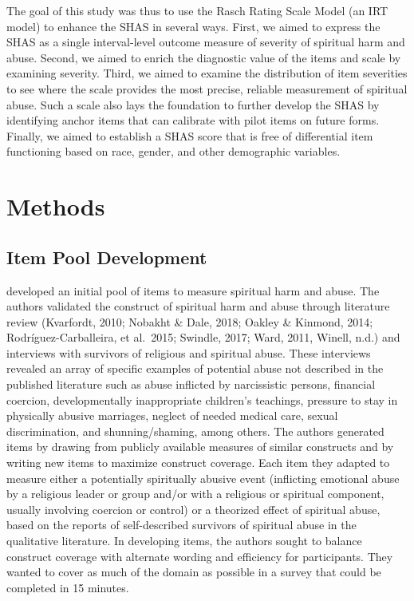 \documentclass[
]{article}
\begin{document}
The goal of this study was thus to use the Rasch Rating Scale Model (an IRT model) to enhance the SHAS in several ways. First, we aimed to express the SHAS as a single interval-level outcome measure of severity of spiritual harm and abuse. Second, we aimed to enrich the diagnostic value of the items and scale by examining severity. Third, we aimed to examine the distribution of item severities to see where the scale provides the most precise, reliable measurement of spiritual abuse. Such a scale also lays the foundation to further develop the SHAS by identifying anchor items that can calibrate with pilot items on future forms. Finally, we aimed to establish a SHAS score that is free of differential item functioning based on race, gender, and other demographic variables.

\hypertarget{methods}{%
\section{Methods}\label{methods}}

\hypertarget{item-pool-development}{%
\subsection{Item Pool Development}\label{item-pool-development}}

\citet{KochEdstrom2022} developed an initial pool of items to measure spiritual harm and abuse. The authors validated the construct of spiritual harm and abuse through literature review (Kvarfordt, 2010; Nobakht \& Dale, 2018; Oakley \& Kinmond, 2014; Rodríguez-Carballeira, et al.~2015; Swindle, 2017; Ward, 2011, Winell, n.d.) and interviews with survivors of religious and spiritual abuse. These interviews revealed an array of specific examples of potential abuse not described in the published literature such as abuse inflicted by narcissistic persons, financial coercion, developmentally inappropriate children's teachings, pressure to stay in physically abusive marriages, neglect of needed medical care, sexual discrimination, and shunning/shaming, among others. The authors generated items by drawing from publicly available measures of similar constructs and by writing new items to maximize construct coverage. Each item they adapted to measure either a potentially spiritually abusive event (inflicting emotional abuse by a religious leader or group and/or with a religious or spiritual component, usually involving coercion or control) or a theorized effect of spiritual abuse, based on the reports of self-described survivors of spiritual abuse in the qualitative literature. In developing items, the authors sought to balance construct coverage with alternate wording and efficiency for participants. They wanted to cover as much of the domain as possible in a survey that could be completed in 15 minutes.
\end{document}
